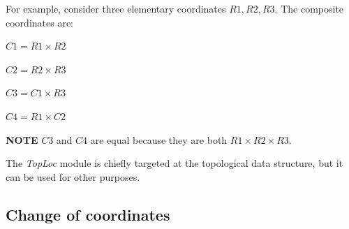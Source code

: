 For example, consider three elementary coordinates $R1, R2, R3$. The composite coordinates are\+:

$C1 = R1 \times R2$

$C2 = R2 \times R3$

$C3 = C1 \times R3$

$C4 = R1 \times C2$

{\bfseries N\+O\+TE} $C3$ and $C4$ are equal because they are both $R1 \times R2 \times R3$.

The {\itshape Top\+Loc} module is chiefly targeted at the topological data structure, but it can be used for other purposes.

\subsection*{Change of coordinates }

